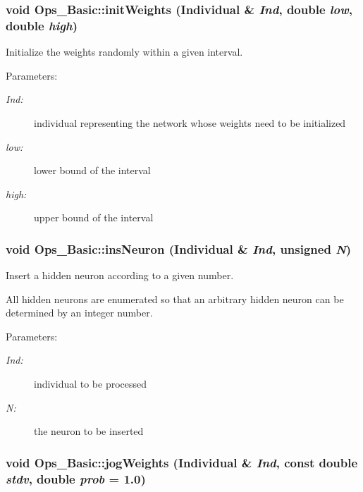 \subsubsection{\setlength{\rightskip}{0pt plus 5cm}void Ops\_\-Basic::init\-Weights (Individual \& {\em Ind}, double {\em low}, double {\em high})}\label{classOps__Basic_a1}


Initialize the weights randomly within a given interval.

\begin{Desc}
\item[Parameters: ]\par
\begin{description}
\item[{\em 
Ind:}]individual representing the network whose weights need to be initialized \item[{\em 
low:}]lower bound of the interval \item[{\em 
high:}]upper bound of the interval \end{description}
\end{Desc}
\subsubsection{\setlength{\rightskip}{0pt plus 5cm}void Ops\_\-Basic::ins\-Neuron (Individual \& {\em Ind}, unsigned {\em N})\hspace{0.3cm}{\tt  [protected]}}\label{classOps__Basic_b3}


Insert a hidden neuron according to a given number.

All hidden neurons are enumerated so that an arbitrary hidden neuron can be determined by an integer number. \begin{Desc}
\item[Parameters: ]\par
\begin{description}
\item[{\em 
Ind:}]individual to be processed \item[{\em 
N:}]the neuron to be inserted \end{description}
\end{Desc}
\subsubsection{\setlength{\rightskip}{0pt plus 5cm}void Ops\_\-Basic::jog\-Weights (Individual \& {\em Ind}, const double {\em stdv}, double {\em prob} = 1.0)}\label{classOps__Basic_a16}


